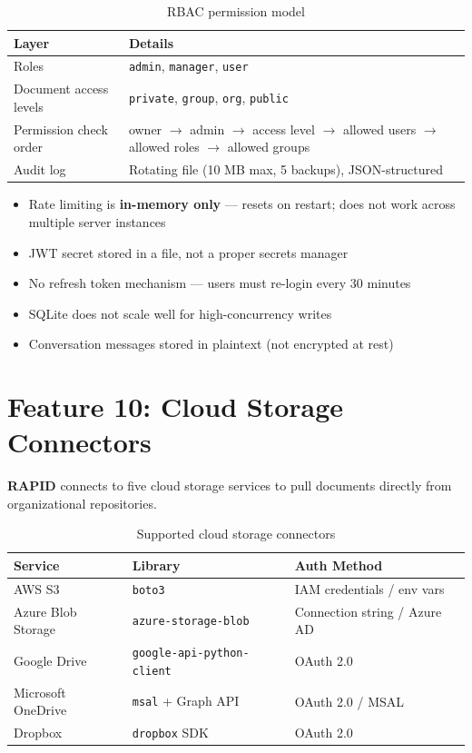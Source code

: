 \documentclass[12pt, a4paper, oneside]{report}
\newcommand{\kw}[1]{\texttt{\small #1}}
\newcommand{\rapidsys}{\textbf{\color{rapidblue}RAPID}}
\begin{document}
\begin{table}[H]
\centering
{}
\begin{tabularx}{\linewidth}{lX}
\toprule
\rowcolor{rapidblue!10}
\textbf{Layer} & \textbf{Details} \\
\midrule
Roles & \kw{admin}, \kw{manager}, \kw{user} \\
Document access levels & \kw{private}, \kw{group}, \kw{org}, \kw{public} \\
Permission check order & owner $\to$ admin $\to$ access level $\to$ allowed users $\to$ allowed roles $\to$ allowed groups \\
Audit log & Rotating file (10 MB max, 5 backups), JSON-structured \\
\bottomrule
\end{tabularx}
\caption{RBAC permission model}
\end{table}

\begin{conbox}[Drawbacks]
\begin{itemize}
  \item Rate limiting is \textbf{in-memory only} — resets on restart; does not work across multiple server instances
  \item JWT secret stored in a file, not a proper secrets manager
  \item No refresh token mechanism — users must re-login every 30 minutes
  \item SQLite does not scale well for high-concurrency writes
  \item Conversation messages stored in plaintext (not encrypted at rest)
\end{itemize}
\end{conbox}

\section{Feature 10: Cloud Storage Connectors}

\rapidsys{} connects to five cloud storage services to pull documents directly from
organizational repositories.

\begin{table}[H]
\centering
{}
\begin{tabularx}{\linewidth}{llX}
\toprule
\rowcolor{rapidblue!10}
\textbf{Service} & \textbf{Library} & \textbf{Auth Method} \\
\midrule
AWS S3 & \kw{boto3} & IAM credentials / env vars \\
Azure Blob Storage & \kw{azure-storage-blob} & Connection string / Azure AD \\
Google Drive & \kw{google-api-python-client} & OAuth 2.0 \\
Microsoft OneDrive & \kw{msal} + Graph API & OAuth 2.0 / MSAL \\
Dropbox & \kw{dropbox} SDK & OAuth 2.0 \\
\bottomrule
\end{tabularx}
\caption{Supported cloud storage connectors}
\end{table}
\end{document}
